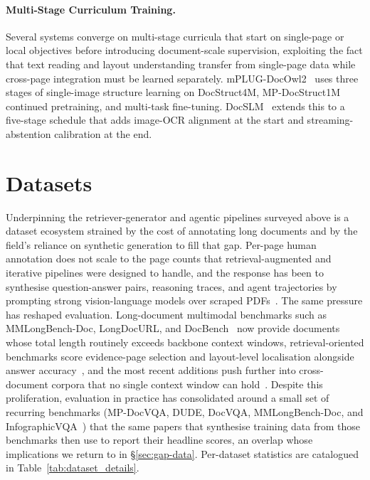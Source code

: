 \documentclass[11pt]{article}
\begin{document}
\paragraph{Multi-Stage Curriculum Training.} Several systems converge on multi-stage curricula that start on single-page or local objectives before introducing document-scale supervision, exploiting the fact that text reading and layout understanding transfer from single-page data while cross-page integration must be learned separately. mPLUG-DocOwl2~\cite{hu2025mplugdocowl2} uses three stages of single-image structure learning on DocStruct4M, MP-DocStruct1M continued pretraining, and multi-task fine-tuning. DocSLM~\cite{hannan2025docslm} extends this to a five-stage schedule that adds image-OCR alignment at the start and streaming-abstention calibration at the end.



\section{Datasets}
\label{sec:datasets}
Underpinning the retriever-generator and agentic pipelines surveyed above is a dataset ecosystem strained by the cost of annotating long documents and by the field's reliance on synthetic generation to fill that gap. Per-page human annotation does not scale to the page counts that retrieval-augmented and iterative pipelines were designed to handle, and the response has been to synthesise question-answer pairs, reasoning traces, and agent trajectories by prompting strong vision-language models over scraped PDFs~\cite{xie2024wukong,tanaka2025vdocrag,wu2025molorag,zhang2026docdancer,guo2026endtoend}. The same pressure has reshaped evaluation. Long-document multimodal benchmarks such as MMLongBench-Doc, LongDocURL, and DocBench~\cite{ma2024mmlongbenchdoc,deng2025longdocurl,zou2024docbench} now provide documents whose total length routinely exceeds backbone context windows, retrieval-oriented benchmarks score evidence-page selection and layout-level localisation alongside answer accuracy~\cite{hui2024uda,xiong2026docr1,zhu2025doclens}, and the most recent additions push further into cross-document corpora that no single context window can hold~\cite{cho2024m3docrag,wang2025vidorag,suri2025visdom}. Despite this proliferation, evaluation in practice has consolidated around a small set of recurring benchmarks (MP-DocVQA, DUDE, DocVQA, MMLongBench-Doc, and InfographicVQA~\cite{tito2023hierarchical,vanlandeghem2023document,mathew2021docvqa,mathew2022infographicvqa}) that the same papers that synthesise training data from those benchmarks then use to report their headline scores, an overlap whose implications we return to in \S\ref{sec:gap-data}. Per-dataset statistics are catalogued in Table~\ref{tab:dataset_details}.
\end{document}
